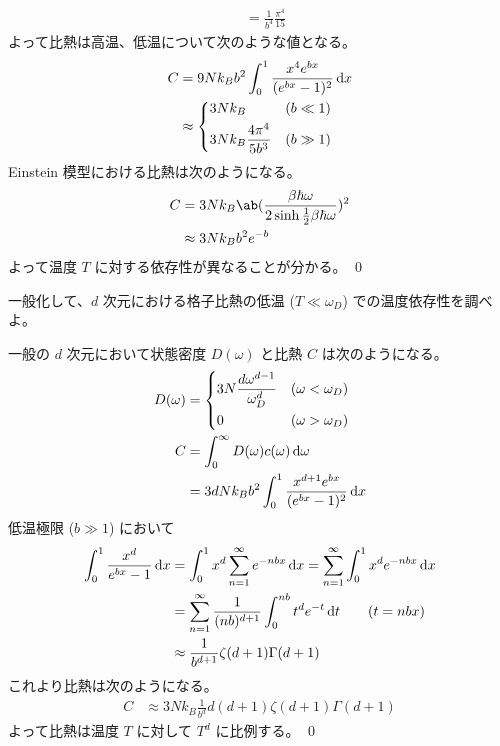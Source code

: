 \documentclass[uplatex,dvipdfmx,a4paper,11pt]{jlreq}
\makeatletter
\numberwithin{equation}{section}
\theoremstyle{definition}
\renewenvironment{proof}[1][\proofname]{\par
  \normalfont
  \topsep6\p@\@plus6\p@ \trivlist
  \item[\hskip\labelsep{\bfseries #1}\@addpunct{\bfseries}]\ignorespaces\quad\par
}{%
  \qed\endtrivlist\@endpefalse
}
\renewcommand\proofname{証明}
\makeatother
\begin{document}
\begin{proof}
\begin{align}
                                         & = \frac{1}{b^4}\frac{\pi^4}{15}
  \end{align}
  よって比熱は高温、低温について次のような値となる。
  \begin{align}
    C & = 9Nk_Bb^2\int_0^1\frac{x^4e^{bx}}{(e^{bx} - 1)^2}\dl{x} \\
      & \approx \begin{dcases}
                  3Nk_B                    & (b \ll 1) \\
                  3Nk_B\frac{4\pi^4}{5b^3} & (b \gg 1)
                \end{dcases}
  \end{align}
  Einstein 模型における比熱は次のようになる。
  \begin{align}
    C & = 3Nk_B\ab(\frac{\beta\hbar\omega}{2\sinh\frac{1}{2}\beta\hbar\omega})^2 \\
      & \approx 3Nk_Bb^2e^{-b}
  \end{align}
  よって温度 $T$ に対する依存性が異なることが分かる。
\end{proof}

\begin{problem}
一般化して、$d$ 次元における格子比熱の低温 ($T \ll \omega_D$) での温度依存性を調べよ。
\end{problem}
\begin{proof}
  一般の $d$ 次元において状態密度 $D(\omega)$ と比熱 $C$ は次のようになる。
  \begin{align}
    D(\omega) & = \begin{dcases}
                    3N\frac{d\omega^{d-1}}{\omega_D^d} & (\omega < \omega_D) \\
                    0                                  & (\omega > \omega_D)
                  \end{dcases} \\
    C         & = \int_0^\infty D(\omega)c(\omega)\dl{\omega}                         \\
              & = 3dNk_Bb^2\int_0^1\frac{x^{d+1}e^{bx}}{(e^{bx} - 1)^2}\dl{x}         \\
  \end{align}
  低温極限 ($b \gg 1$) において
  \begin{align}
    \int_0^1\frac{x^{d}}{e^{bx} - 1}\dl{x} & = \int_0^1x^d\sum_{n=1}^{\infty}e^{-nbx}\dl{x} = \sum_{n=1}^{\infty}\int_0^1x^de^{-nbx}\dl{x} \\
                                           & = \sum_{n=1}^{\infty}\frac{1}{(nb)^{d+1}}\int_0^{nb}t^de^{-t}\dl{t} \qquad (t = nbx)          \\
                                           & \approx \frac{1}{b^{d+1}}\zeta(d+1)\Gamma(d+1)
  \end{align}
  これより比熱は次のようになる。
  \begin{align}
    C & \approx 3Nk_B\frac{1}{b^d}d(d+1)\zeta(d+1)\Gamma(d+1)
  \end{align}
  よって比熱は温度 $T$ に対して $T^d$ に比例する。
\end{proof}
\end{document}
